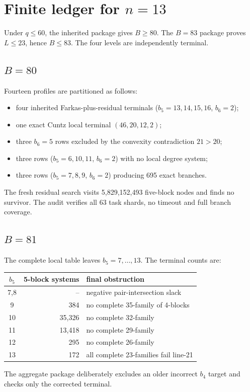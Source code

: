 \documentclass[11pt]{article}
\begin{document}
\section{Finite ledger for $n=13$}

Under $q\le60$, the inherited package gives $B\ge80$.  The $B=83$ package proves $L\le23$, hence $B\le83$.  The four levels are independently terminal.

\subsection{$B=80$}

Fourteen profiles are partitioned as follows:
\begin{itemize}
\item four inherited Farkas-plus-residual terminals ($b_5=13,14,15,16$, $b_6=2$);
\item one exact Cuntz local terminal $(46,20,12,2)$;
\item three $b_6=5$ rows excluded by the convexity contradiction $21>20$;
\item three rows ($b_5=6,10,11$, $b_6=2$) with no local degree system;
\item three rows ($b_5=7,8,9$, $b_6=2$) producing 695 exact branches.
\end{itemize}
The fresh residual search visits 5,829,152,493 five-block nodes and finds no survivor.  The audit verifies all 63 task shards, no timeout and full branch coverage.

\subsection{$B=81$}

The complete local table leaves $b_5=7,\ldots,13$.  The terminal counts are:
\begin{center}
\begin{tabular}{c r l}
\toprule
$b_5$ & 5-block systems & final obstruction \\
\midrule
7,8 & -- & negative pair-intersection slack \\
9 & 384 & no complete 35-family of 4-blocks \\
10 & 35,326 & no complete 32-family \\
11 & 13,418 & no complete 29-family \\
12 & 295 & no complete 26-family \\
13 & 172 & all complete 23-families fail line-21 \\
\bottomrule
\end{tabular}
\end{center}
The aggregate package deliberately excludes an older incorrect $b_4$ target and checks only the corrected terminal.
\end{document}
